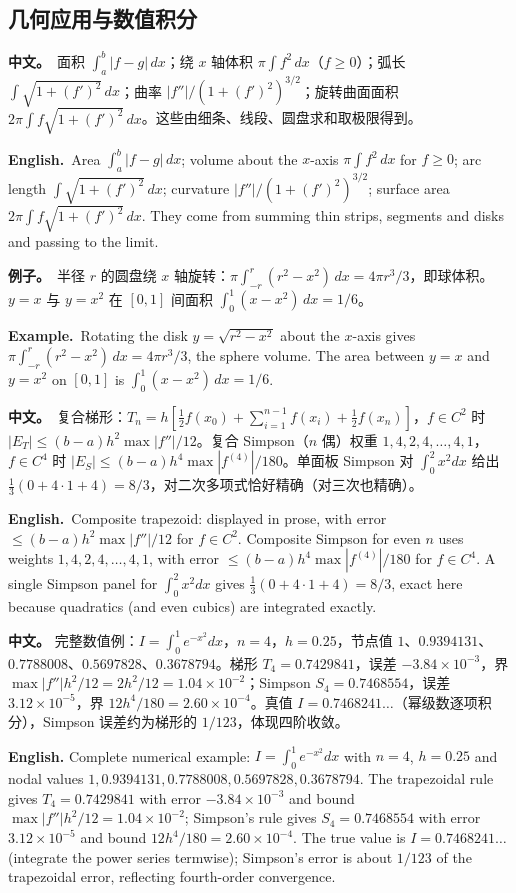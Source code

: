 \documentclass[UTF8,11pt,a4paper]{ctexart}
\newcommand{\BOTH}[2]{\par\noindent\textbf{中文。}\ #1\par\noindent\textbf{English.}\ #2\par}
\newcommand{\EX}[2]{\par\noindent\textbf{例子。}\ #1\par\noindent\textbf{Example.}\ #2\par}
\newcommand{\APS}[2]{\par\noindent\textbf{中文。} #1\par\noindent\textbf{English.} #2\par\smallskip}
\begin{document}
\subsection{几何应用与数值积分}
\BOTH{面积 $\int_a^b|f-g|\,dx$；绕 $x$ 轴体积 $\pi\int f^2\,dx$（$f\ge0$）；弧长 $\int\sqrt{1+(f')^2}\,dx$；曲率 $|f''|/(1+(f')^2)^{3/2}$；旋转曲面面积 $2\pi\int f\sqrt{1+(f')^2}\,dx$。这些由细条、线段、圆盘求和取极限得到。}{Area $\int_a^b|f-g|\,dx$; volume about the $x$-axis $\pi\int f^2\,dx$ for $f\ge0$; arc length $\int\sqrt{1+(f')^2}\,dx$; curvature $|f''|/(1+(f')^2)^{3/2}$; surface area $2\pi\int f\sqrt{1+(f')^2}\,dx$. They come from summing thin strips, segments and disks and passing to the limit.}
\EX{半径 $r$ 的圆盘绕 $x$ 轴旋转：$\pi\int_{-r}^r(r^2-x^2)\,dx=4\pi r^3/3$，即球体积。$y=x$ 与 $y=x^2$ 在 $[0,1]$ 间面积 $\int_0^1(x-x^2)\,dx=1/6$。}{Rotating the disk $y=\sqrt{r^2-x^2}$ about the $x$-axis gives $\pi\int_{-r}^r(r^2-x^2)\,dx=4\pi r^3/3$, the sphere volume. The area between $y=x$ and $y=x^2$ on $[0,1]$ is $\int_0^1(x-x^2)\,dx=1/6$.}
\BOTH{复合梯形：$T_n=h[\frac12f(x_0)+\sum_{i=1}^{n-1}f(x_i)+\frac12f(x_n)]$，$f\in C^2$ 时 $|E_T|\le(b-a)h^2\max|f''|/12$。复合 Simpson（$n$ 偶）权重 $1,4,2,4,\ldots,4,1$，$f\in C^4$ 时 $|E_S|\le(b-a)h^4\max|f^{(4)}|/180$。单面板 Simpson 对 $\int_0^2x^2dx$ 给出 $\frac13(0+4\cdot1+4)=8/3$，对二次多项式恰好精确（对三次也精确）。}{Composite trapezoid: displayed in prose, with error $\le(b-a)h^2\max|f''|/12$ for $f\in C^2$. Composite Simpson for even $n$ uses weights $1,4,2,4,\ldots,4,1$, with error $\le(b-a)h^4\max|f^{(4)}|/180$ for $f\in C^4$. A single Simpson panel for $\int_0^2x^2dx$ gives $\frac13(0+4\cdot1+4)=8/3$, exact here because quadratics (and even cubics) are integrated exactly.}
\APS{完整数值例：$I=\int_0^1e^{-x^2}dx$，$n=4$，$h=0.25$，节点值 $1$、$0.9394131$、$0.7788008$、$0.5697828$、$0.3678794$。梯形 $T_4=0.7429841$，误差 $-3.84\times10^{-3}$，界 $\max|f''|h^2/12=2h^2/12=1.04\times10^{-2}$；Simpson $S_4=0.7468554$，误差 $3.12\times10^{-5}$，界 $12h^4/180=2.60\times10^{-4}$。真值 $I=0.7468241\ldots$（幂级数逐项积分），Simpson 误差约为梯形的 $1/123$，体现四阶收敛。}{Complete numerical example: $I=\int_0^1e^{-x^2}dx$ with $n=4$, $h=0.25$ and nodal values $1,0.9394131,0.7788008,0.5697828,0.3678794$. The trapezoidal rule gives $T_4=0.7429841$ with error $-3.84\times10^{-3}$ and bound $\max|f''|h^2/12=1.04\times10^{-2}$; Simpson's rule gives $S_4=0.7468554$ with error $3.12\times10^{-5}$ and bound $12h^4/180=2.60\times10^{-4}$. The true value is $I=0.7468241\ldots$ (integrate the power series termwise); Simpson's error is about $1/123$ of the trapezoidal error, reflecting fourth-order convergence.}
\end{document}
